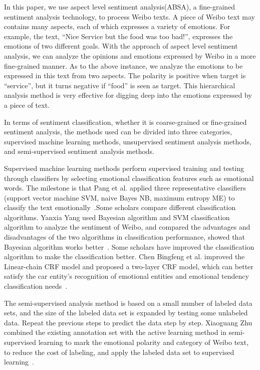 \documentclass[runningheads, twocolumn]{llncs}
\begin{document}
In this paper, we use aspect level sentiment analysis(ABSA), a fine-grained sentiment analysis technology, to process Weibo texts. A piece of Weibo text may contains many aspects, each of which expresses a variety of emotions. For example, the text, “Nice Service but the food was too bad!”, expresses the emotions of two different goals. With the approach of aspect level sentiment analysis, we can analyze the opinions and emotions expressed by Weibo in a more fine-grained manner. As to the above instance, we analyze the emotions to be expressed in this text from two aspects. The polarity is positive when target is “service”, but it turns negative if “food” is seen as target. This hierarchical analysis method is very effective for digging deep into the emotions expressed by a piece of text.

In terms of sentiment classification, whether it is coarse-grained or fine-grained sentiment analysis, the methods used can be divided into three categories, supervised machine learning methods, unsupervised sentiment analysis methods, and semi-supervised sentiment analysis methods.

Supervised machine learning methods perform supervised training and testing through classifiers by selecting emotional classification features such as emotional words. The milestone is that Pang et al. applied three representative classifiers (support vector machine SVM, naive Bayes NB, maximum entropy ME) to classify the text emotionally~\cite{DBLP:conf/emnlp/PangLV02}.Some scholars compare different classification algorithms. Yanxia Yang used Bayesian algorithm and SVM classification algorithm to analyze the sentiment of Weibo, and compared the advantages and disadvantages of the two algorithms in classification performance, showed that Bayesian algorithm works better~\cite{yang2015microblog}. Some scholars have improved the classification algorithm to make the classification better. Chen Bingfeng et al. improved the Linear-chain CRF model and proposed a two-layer CRF model, which can better satisfy the car entity's recognition of emotional entities and emotional tendency classification needs~\cite{Chen2017A}.

The semi-supervised analysis method is based on a small number of labeled data sets, and the size of the labeled data set is expanded by testing some unlabeled data. Repeat the previous steps to predict the data step by step. Xiaoguang Zhu combined the existing annotation set with the active learning method in semi-supervised learning to mark the emotional polarity and category of Weibo text, to reduce the cost of labeling, and apply the labeled data set to supervised learning~\cite{zhu2013chinese}.
\end{document}
